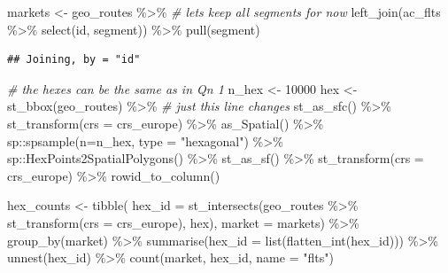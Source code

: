 \documentclass[
]{book}
\newenvironment{Shaded}{\begin{snugshade}}{\end{snugshade}}
\newcommand{\AttributeTok}[1]{\textcolor[rgb]{0.77,0.63,0.00}{#1}}
\newcommand{\CommentTok}[1]{\textcolor[rgb]{0.56,0.35,0.01}{\textit{#1}}}
\newcommand{\DecValTok}[1]{\textcolor[rgb]{0.00,0.00,0.81}{#1}}
\newcommand{\FunctionTok}[1]{\textcolor[rgb]{0.00,0.00,0.00}{#1}}
\newcommand{\NormalTok}[1]{#1}
\newcommand{\OtherTok}[1]{\textcolor[rgb]{0.56,0.35,0.01}{#1}}
\newcommand{\SpecialCharTok}[1]{\textcolor[rgb]{0.00,0.00,0.00}{#1}}
\newcommand{\StringTok}[1]{\textcolor[rgb]{0.31,0.60,0.02}{#1}}
\begin{document}
\begin{Shaded}
\begin{Highlighting}[]
\NormalTok{markets }\OtherTok{\textless{}{-}}\NormalTok{ geo\_routes }\SpecialCharTok{\%\textgreater{}\%} 
  \CommentTok{\# let\textquotesingle{}s keep all segments for now}
  \FunctionTok{left\_join}\NormalTok{(ac\_flts }\SpecialCharTok{\%\textgreater{}\%} \FunctionTok{select}\NormalTok{(id, segment)) }\SpecialCharTok{\%\textgreater{}\%} 
  \FunctionTok{pull}\NormalTok{(segment)}
\end{Highlighting}
\end{Shaded}

\begin{verbatim}
## Joining, by = "id"
\end{verbatim}

\begin{Shaded}
\begin{Highlighting}[]
\CommentTok{\# the hexes can be the same as in Qn 1}
\NormalTok{n\_hex }\OtherTok{\textless{}{-}} \DecValTok{10000}
\NormalTok{hex }\OtherTok{\textless{}{-}} \FunctionTok{st\_bbox}\NormalTok{(geo\_routes) }\SpecialCharTok{\%\textgreater{}\%} \CommentTok{\# just this line changes}
  \FunctionTok{st\_as\_sfc}\NormalTok{() }\SpecialCharTok{\%\textgreater{}\%} 
  \FunctionTok{st\_transform}\NormalTok{(}\AttributeTok{crs =}\NormalTok{ crs\_europe) }\SpecialCharTok{\%\textgreater{}\%} 
  \FunctionTok{as\_Spatial}\NormalTok{() }\SpecialCharTok{\%\textgreater{}\%} 
\NormalTok{  sp}\SpecialCharTok{::}\FunctionTok{spsample}\NormalTok{(}\AttributeTok{n=}\NormalTok{n\_hex, }\AttributeTok{type =} \StringTok{"hexagonal"}\NormalTok{) }\SpecialCharTok{\%\textgreater{}\%} 
\NormalTok{  sp}\SpecialCharTok{::}\FunctionTok{HexPoints2SpatialPolygons}\NormalTok{() }\SpecialCharTok{\%\textgreater{}\%} 
  \FunctionTok{st\_as\_sf}\NormalTok{() }\SpecialCharTok{\%\textgreater{}\%} 
  \FunctionTok{st\_transform}\NormalTok{(}\AttributeTok{crs =}\NormalTok{ crs\_europe) }\SpecialCharTok{\%\textgreater{}\%} 
  \FunctionTok{rowid\_to\_column}\NormalTok{() }

\NormalTok{hex\_counts }\OtherTok{\textless{}{-}} \FunctionTok{tibble}\NormalTok{(}
    \AttributeTok{hex\_id =} \FunctionTok{st\_intersects}\NormalTok{(geo\_routes }\SpecialCharTok{\%\textgreater{}\%} 
                         \FunctionTok{st\_transform}\NormalTok{(}\AttributeTok{crs =}\NormalTok{ crs\_europe), }
\NormalTok{                         hex),}
    \AttributeTok{market =}\NormalTok{ markets) }\SpecialCharTok{\%\textgreater{}\%} 
  \FunctionTok{group\_by}\NormalTok{(market) }\SpecialCharTok{\%\textgreater{}\%} 
  \FunctionTok{summarise}\NormalTok{(}\AttributeTok{hex\_id =} \FunctionTok{list}\NormalTok{(}\FunctionTok{flatten\_int}\NormalTok{(hex\_id))) }\SpecialCharTok{\%\textgreater{}\%} 
  \FunctionTok{unnest}\NormalTok{(hex\_id) }\SpecialCharTok{\%\textgreater{}\%} 
  \FunctionTok{count}\NormalTok{(market, hex\_id, }\AttributeTok{name =} \StringTok{"flts"}\NormalTok{)}


\end{Highlighting}
\end{Shaded}
\end{document}
